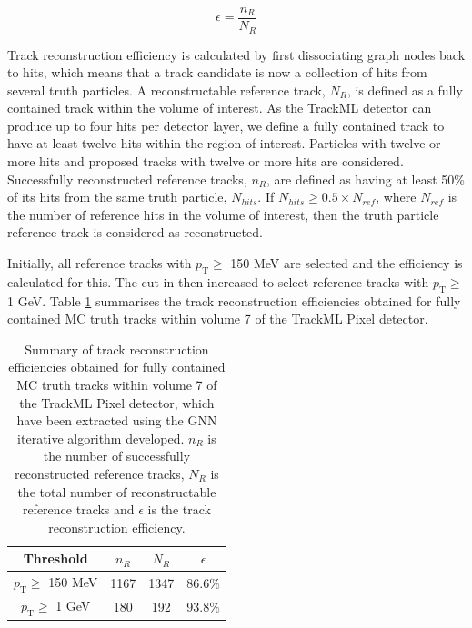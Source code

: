 \begin{equation}
    \epsilon = \frac{n_R}{N_R}
    \label{eqn:reoncstruction-eff}
\end{equation}

Track reconstruction efficiency is calculated by first dissociating graph nodes back to hits, which means that a track candidate is now a collection of hits from several truth particles. A reconstructable reference track, $N_R$, is defined as a fully contained track within the volume of interest. As the TrackML detector can produce up to four hits per detector layer, we define a fully contained track to have at least twelve hits within the region of interest. Particles with twelve or more hits and proposed tracks with twelve or more hits are considered. Successfully reconstructed reference tracks, $n_R$, are defined as having at least 50\% of its hits from the same truth particle, $N_{hits}$. If $N_{hits} \geq 0.5 \times N_{ref}$, where $N_{ref}$ is the number of reference hits in the volume of interest, then the truth particle reference track is considered as reconstructed.

Initially, all reference tracks with $p_{\text{T}} \ge$ 150 MeV are selected and the efficiency is calculated for this. The cut in then increased to select reference tracks with $p_{\text{T}} \ge$ 1 GeV. Table \ref{tab:trackml-track-recon-effs} summarises the track reconstruction efficiencies obtained for fully contained MC truth tracks within volume 7 of the TrackML Pixel detector.


\begin{table}[htbp]
\caption{Summary of track reconstruction efficiencies obtained for fully contained MC truth tracks within volume 7 of the TrackML Pixel detector, which have been extracted using the GNN iterative algorithm developed. $n_R$ is the number of successfully reconstructed reference tracks, $N_R$ is the total number of reconstructable reference tracks and $\epsilon$ is the track reconstruction efficiency. }

\begin{center}
\begin{tabular}{cccc}
\toprule
Threshold & $n_R$ & $N_R$ & $\epsilon$ \\
\hline
$p_{\text{T}} \ge$ 150 MeV    & 1167  & 1347  &  86.6\%    \\
$p_{\text{T}} \ge$ 1 GeV      & 180   & 192   &  93.8\%    \\
\bottomrule
\end{tabular}
\end{center}
\label{tab:trackml-track-recon-effs}
\end{table}

